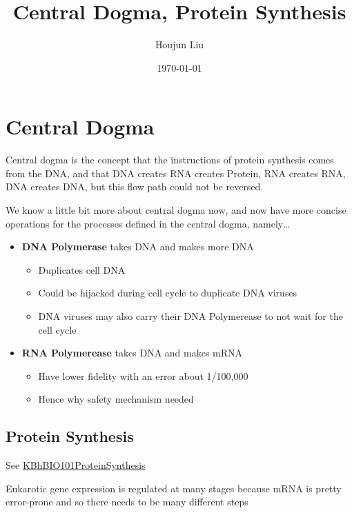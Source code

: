 \documentclass[letterpaper]{article}
\author{Houjun Liu}
\date{\today}
\title{Central Dogma, Protein Synthesis}
\renewcommand\maketitle{}
\begin{document}
\maketitle


\section{Central Dogma}
\label{sec:org26e610b}
Central dogma is the concept that the instructions of protein synthesis
comes from the DNA, and that DNA creates RNA creates Protein, RNA
creates RNA, DNA creates DNA, but this flow path could not be reversed.

We know a little bit more about central dogma now, and now have more
concise operations for the processes defined in the central dogma,
namely\ldots{}

\begin{itemize}
\item \textbf{DNA Polymerase} takes DNA and makes more DNA

\begin{itemize}
\item Duplicates cell DNA
\item Could be hijacked during cell cycle to duplicate DNA viruses
\item DNA viruses may also carry their DNA Polymerease to not wait for the
cell cycle
\end{itemize}

\item \textbf{RNA Polymerease} takes DNA and makes mRNA

\begin{itemize}
\item Have lower fidelity with an error about 1/100,000
\item Hence why safety mechanism needed
\end{itemize}
\end{itemize}

\subsection{Protein Synthesis}
\label{sec:orgb502d6d}
See \href{KBhBIO101ProteinSynthesis.org}{KBhBIO101ProteinSynthesis}

Eukarotic gene expression is regulated at many stages because mRNA is
pretty error-prone and so there needs to be many different steps
\end{document}
